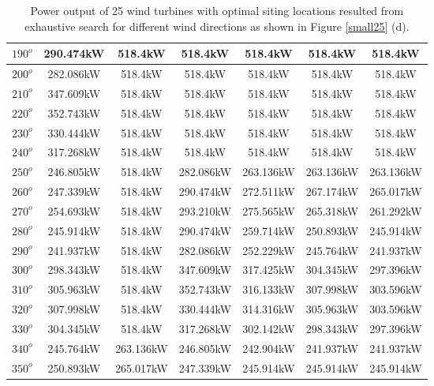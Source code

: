 \begin{table}[H]
\begin{tabular}{|c|c|c|c|c|c|c|}
		$190^o$	& 290.474kW	& 518.4kW	& 518.4kW	& 518.4kW	& 518.4kW	& 518.4kW	\\ \hline
		$200^o$	& 282.086kW	& 518.4kW	& 518.4kW	& 518.4kW	& 518.4kW	& 518.4kW	\\ \hline
		$210^o$	& 347.609kW	& 518.4kW	& 518.4kW	& 518.4kW	& 518.4kW	& 518.4kW	\\ \hline
		$220^o$	& 352.743kW	& 518.4kW	& 518.4kW	& 518.4kW	& 518.4kW	& 518.4kW	\\ \hline
		$230^o$	& 330.444kW	& 518.4kW	& 518.4kW	& 518.4kW	& 518.4kW	& 518.4kW	\\ \hline
		$240^o$	& 317.268kW	& 518.4kW	& 518.4kW	& 518.4kW	& 518.4kW	& 518.4kW	\\ \hline
		$250^o$	& 246.805kW	& 518.4kW	& 282.086kW	& 263.136kW	& 263.136kW	& 263.136kW	\\ \hline
		$260^o$	& 247.339kW	& 518.4kW	& 290.474kW	& 272.511kW	& 267.174kW	& 265.017kW	\\ \hline
		$270^o$	& 254.693kW	& 518.4kW	& 293.210kW	& 275.565kW	& 265.318kW	& 261.292kW	\\ \hline
		$280^o$	& 245.914kW	& 518.4kW	& 290.474kW	& 259.714kW	& 250.893kW	& 245.914kW	\\ \hline
		$290^o$	& 241.937kW	& 518.4kW	& 282.086kW	& 252.229kW	& 245.764kW	& 241.937kW	\\ \hline
		$300^o$	& 298.343kW	& 518.4kW	& 347.609kW	& 317.425kW	& 304.345kW	& 297.396kW	\\ \hline
		$310^o$	& 305.963kW	& 518.4kW	& 352.743kW	& 316.133kW	& 307.998kW	& 303.596kW	\\ \hline
		$320^o$	& 307.998kW	& 518.4kW	& 330.444kW	& 314.316kW	& 305.963kW	& 303.596kW	\\ \hline
		$330^o$	& 304.345kW	& 518.4kW	& 317.268kW	& 302.142kW	& 298.343kW	& 297.396kW	\\ \hline
		$340^o$	& 245.764kW	& 263.136kW	& 246.805kW	& 242.904kW	& 241.937kW	& 241.937kW	\\ \hline
		$350^o$	& 250.893kW	& 265.017kW	& 247.339kW	& 245.914kW	& 245.914kW	& 245.914kW	\\ \hline
        	\end{tabular}
        	\caption{Power output of 25 wind turbines with optimal siting locations resulted from exhaustive search for different wind directions as shown in Figure \ref{small25} (d).}
        	\label{table25d}
        \end{table}
        \doublespacing
        
